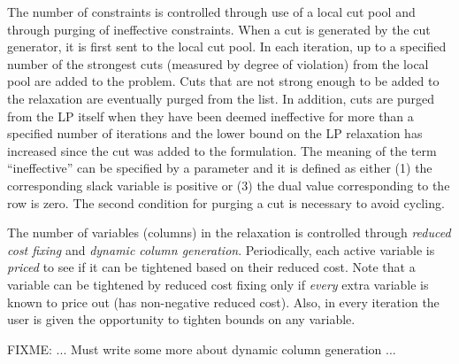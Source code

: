 The number of constraints is controlled through use of a local cut
pool and through purging of ineffective constraints. When a cut is
generated by the cut generator, it is first sent to the local cut
pool. In each iteration, up to a specified number of the strongest
cuts (measured by degree of violation) from the local pool are added
to the problem. Cuts that are not strong enough to be added to the
relaxation are eventually purged from the list. In addition, cuts are
purged from the LP itself when they have been deemed ineffective for
more than a specified number of iterations and the lower bound on the LP
relaxation has increased since the cut was added to the formulation. 
The meaning of the term ``ineffective'' can be specified by a parameter and
it is defined as either (1) the corresponding slack variable is positive or
(3) the dual value corresponding to the row is zero. The second condition for
purging a cut is necessary to avoid cycling.

The number of variables (columns) in the relaxation is controlled
through {\em reduced cost fixing} and {\em dynamic column generation}.
Periodically, each active variable is {\em priced} to see if it can be
tightened based on their reduced cost. Note that a variable can be tightened
by reduced cost fixing only if {\em every} extra variable is known to price
out (has non-negative reduced cost). Also, in every iteration the user is
given the opportunity to tighten bounds on any variable.

FIXME: ... Must write some more about dynamic column generation ...



